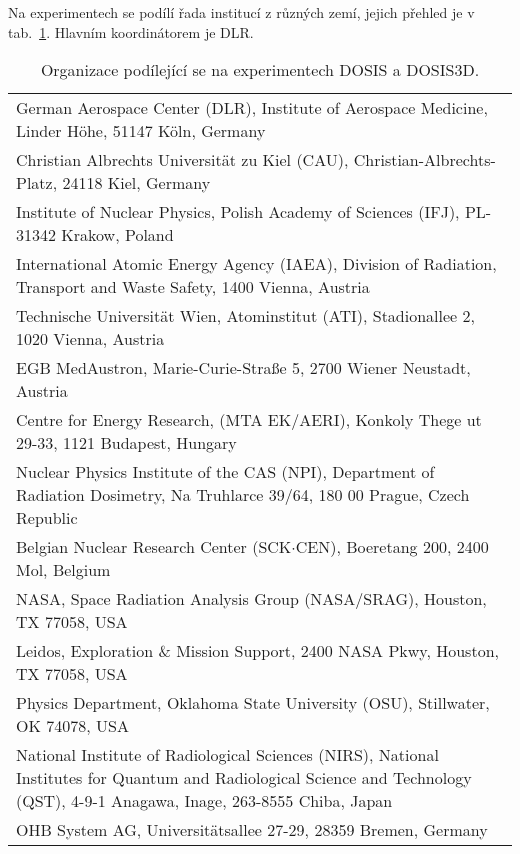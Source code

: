 Na experimentech se podílí řada institucí z různých zemí, jejich přehled je v tab.~\ref{tab:dosis_instituce}. Hlavním koordinátorem je DLR. 
\begin{table}[H]
  \centering
\renewcommand{\baselinestretch}{0.8}
\renewcommand{\arraystretch}{2}
\footnotesize
\caption{Organizace podílející se na experimentech DOSIS a DOSIS3D. \cite{dosis}}
  \label{tab:dosis_instituce}
  \begin{tabularx}{\textwidth}{X}
    \toprule
German Aerospace Center (DLR), Institute of Aerospace Medicine, Linder Höhe, 51147 Köln, Germany\\
Christian Albrechts Universität zu Kiel (CAU), Christian-Albrechts-Platz, 24118 Kiel, Germany                                    \\
Institute of Nuclear Physics, Polish Academy of Sciences (IFJ), PL-31342 Krakow, Poland                                          \\
International Atomic Energy Agency (IAEA), Division of Radiation, Transport and Waste Safety, 1400 Vienna, Austria               \\
Technische Universität Wien, Atominstitut (ATI), Stadionallee 2, 1020 Vienna, Austria                                            \\
EGB MedAustron, Marie-Curie-Straße 5, 2700 Wiener Neustadt, Austria                                                              \\
Centre for Energy Research, (MTA EK/AERI), Konkoly Thege ut 29-33, 1121 Budapest, Hungary                                             \\
Nuclear Physics Institute of the CAS (NPI), Department of Radiation Dosimetry, Na Truhlarce 39/64, 180 00 Prague, Czech Republic \\
Belgian Nuclear Research Center (SCK$\cdot$CEN), Boeretang 200, 2400 Mol, Belgium    \\
NASA, Space Radiation Analysis Group (NASA/SRAG), Houston, TX 77058, USA       \\
Leidos, Exploration \& Mission Support, 2400 NASA Pkwy, Houston, TX 77058, USA  \\
Physics Department, Oklahoma State University (OSU), Stillwater, OK 74078, USA \\
National Institute of Radiological Sciences (NIRS), National Institutes for Quantum and Radiological Science and Technology (QST), 4-9-1 Anagawa, Inage, 263-8555 Chiba, Japan\\
OHB System AG, Universitätsallee 27-29, 28359 Bremen, Germany\\
\bottomrule
  \end{tabularx}
\end{table}

